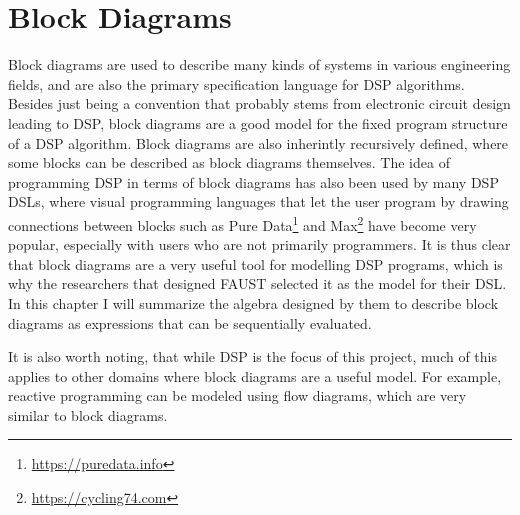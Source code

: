 \newcommand{\Block}[1]{\ensuremath{\textsc{#1}}\xspace}
\newcommand{\Ident}{\Block{ident}}
\newcommand{\Cut}{\Block{cut}}
\newcommand{\Sequential}{\Block{seq}}
\newcommand{\Parallel}{\Block{par}}
\newcommand{\Recursive}{\Block{rec}}
\newcommand{\Resample}{\Block{resample}}
\newcommand{\Split}{\Block{split}}
\newcommand{\Merge}{\Block{merge}}
\newcommand{\Mem}{\Block{mem}}
\newcommand{\Delay}{\Block{delay}}
\newcommand{\Ins}{\ensuremath{\textbf{ins}}\xspace}
\newcommand{\Outs}{\ensuremath{\textbf{outs}}\xspace}
\newcommand{\Sig}{\ensuremath{\mathbb{S}}\xspace}
\newcommand{\SigP}[1]{\ensuremath{\llbracket #1 \rrbracket}\xspace}


\chapter{Block Diagrams}
\label{chap:blocks}

Block diagrams are used to describe many kinds of systems in various engineering fields, and are also the
primary specification language for DSP algorithms\autocite{kahles2019oversampling, castillocomparative, thomas2009, pirkle2019designing, fiir}. Besides just being a convention that
probably stems from electronic circuit design leading to DSP, block diagrams are a good model for the fixed
program structure of a DSP algorithm. Block diagrams are also inherintly recursively defined, where some
blocks can be described as block diagrams themselves. The idea of programming DSP in terms of block diagrams
has also been used by many DSP DSLs, where visual programming languages that let the user program by drawing
connections between blocks such as Pure Data\footnote{\url{https://puredata.info}} and Max\footnote{\url{https://cycling74.com}} have
become very popular, especially with users who are not primarily programmers. It is thus clear that block
diagrams are a very useful tool for modelling DSP programs, which is why the researchers that designed FAUST
selected it as the model for their DSL\autocite{orlarey2004}. In this chapter I will summarize the algebra
designed by them to describe block diagrams as expressions that can be sequentially evaluated.

It is also worth noting, that while DSP is the focus of this project, much of this applies to other domains
where block diagrams are a useful model. For example, reactive programming\autocite{wan2000functional} can be
modeled using flow diagrams\autocite{reactiveprog}, which are very similar to block diagrams.

